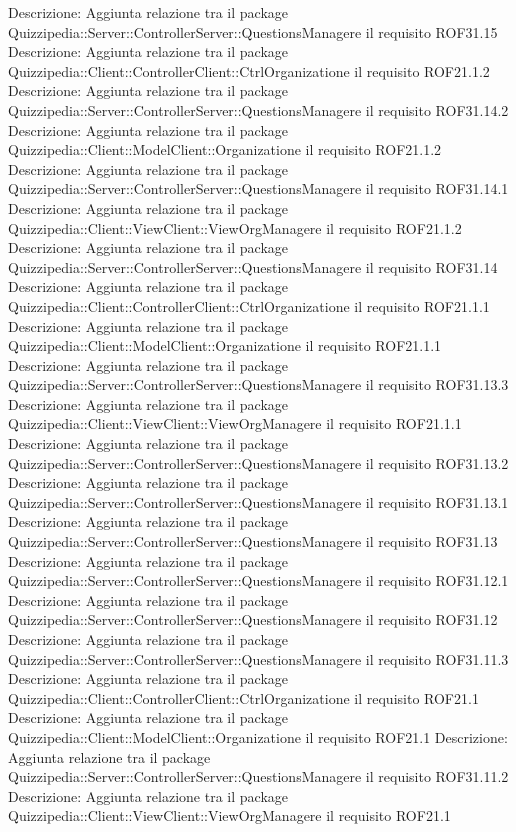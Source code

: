 Descrizione: Aggiunta relazione tra il package Quizzipedia::Server::ControllerServer::QuestionsManagere il requisito ROF31.15 
Descrizione: Aggiunta relazione tra il package Quizzipedia::Client::ControllerClient::CtrlOrganizatione il requisito ROF21.1.2 
Descrizione: Aggiunta relazione tra il package Quizzipedia::Server::ControllerServer::QuestionsManagere il requisito ROF31.14.2 
Descrizione: Aggiunta relazione tra il package Quizzipedia::Client::ModelClient::Organizatione il requisito ROF21.1.2 
Descrizione: Aggiunta relazione tra il package Quizzipedia::Server::ControllerServer::QuestionsManagere il requisito ROF31.14.1 
Descrizione: Aggiunta relazione tra il package Quizzipedia::Client::ViewClient::ViewOrgManagere il requisito ROF21.1.2 
Descrizione: Aggiunta relazione tra il package Quizzipedia::Server::ControllerServer::QuestionsManagere il requisito ROF31.14 
Descrizione: Aggiunta relazione tra il package Quizzipedia::Client::ControllerClient::CtrlOrganizatione il requisito ROF21.1.1 
Descrizione: Aggiunta relazione tra il package Quizzipedia::Client::ModelClient::Organizatione il requisito ROF21.1.1 
Descrizione: Aggiunta relazione tra il package Quizzipedia::Server::ControllerServer::QuestionsManagere il requisito ROF31.13.3 
Descrizione: Aggiunta relazione tra il package Quizzipedia::Client::ViewClient::ViewOrgManagere il requisito ROF21.1.1 
Descrizione: Aggiunta relazione tra il package Quizzipedia::Server::ControllerServer::QuestionsManagere il requisito ROF31.13.2 
Descrizione: Aggiunta relazione tra il package Quizzipedia::Server::ControllerServer::QuestionsManagere il requisito ROF31.13.1 
Descrizione: Aggiunta relazione tra il package Quizzipedia::Server::ControllerServer::QuestionsManagere il requisito ROF31.13 
Descrizione: Aggiunta relazione tra il package Quizzipedia::Server::ControllerServer::QuestionsManagere il requisito ROF31.12.1 
Descrizione: Aggiunta relazione tra il package Quizzipedia::Server::ControllerServer::QuestionsManagere il requisito ROF31.12 
Descrizione: Aggiunta relazione tra il package Quizzipedia::Server::ControllerServer::QuestionsManagere il requisito ROF31.11.3 
Descrizione: Aggiunta relazione tra il package Quizzipedia::Client::ControllerClient::CtrlOrganizatione il requisito ROF21.1 
Descrizione: Aggiunta relazione tra il package Quizzipedia::Client::ModelClient::Organizatione il requisito ROF21.1 
Descrizione: Aggiunta relazione tra il package Quizzipedia::Server::ControllerServer::QuestionsManagere il requisito ROF31.11.2 
Descrizione: Aggiunta relazione tra il package Quizzipedia::Client::ViewClient::ViewOrgManagere il requisito ROF21.1 
